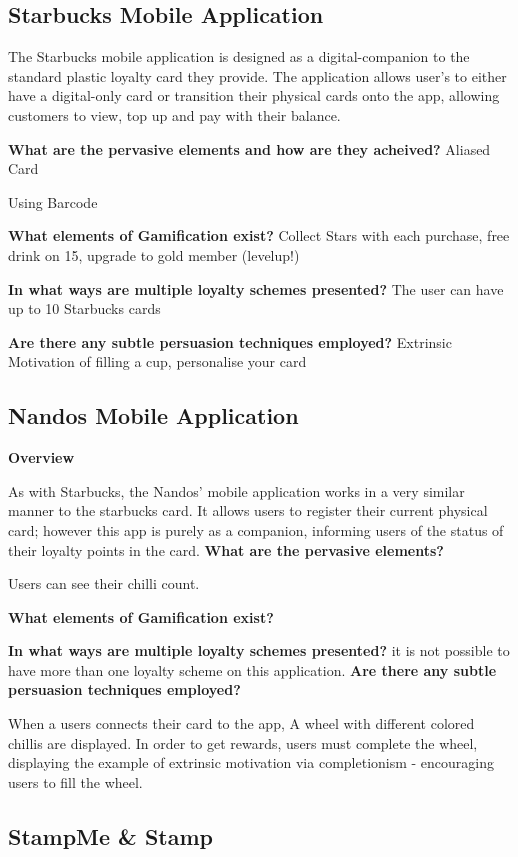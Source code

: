 \subsection{Starbucks Mobile Application}
The Starbucks mobile application is designed as a digital-companion to the standard plastic loyalty card they provide. The application allows user's to either have a digital-only card or transition their physical cards onto the app, allowing customers to view, top up and pay with their balance.

\textbf{What are the pervasive elements and how are they acheived?}
Aliased Card

Using Barcode

\textbf{What elements of Gamification exist?}
Collect Stars with each purchase, free drink on 15, upgrade to gold member (levelup!)


\textbf{In what ways are multiple loyalty schemes presented?}
The user can have up to 10 Starbucks cards

\textbf{Are there any subtle persuasion techniques employed?}
Extrinsic Motivation of filling a cup, personalise your card

\subsection{Nandos Mobile Application}
\textbf{Overview}

As with Starbucks, the Nandos' mobile application works in a very similar manner to the starbucks card. It allows users to register their current physical card; however this app is purely as a companion, informing users of the status of their loyalty points in the card.
\textbf{What are the pervasive elements?}

Users can see their chilli count.

\textbf{What elements of Gamification exist?}


\textbf{In what ways are multiple loyalty schemes presented?}
it is not possible to have more than one loyalty scheme on this application. 
\textbf{Are there any subtle persuasion techniques employed?}

When a users connects their card to the app, A wheel with different colored chillis are displayed. In order to get rewards, users must complete the wheel, displaying the example of extrinsic motivation via completionism - encouraging users to fill the wheel. 
\subsection{StampMe \& Stamp}

